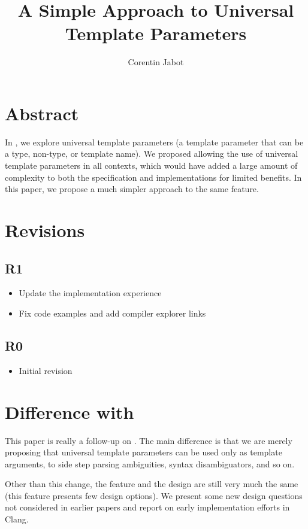 \documentclass{wg21}
\title{A Simple Approach to Universal Template Parameters}
\author{Corentin Jabot}{corentin.jabot@gmail.com}
\begin{document}
\maketitle

\section{Abstract}
In , we explore universal template parameters (a template parameter that can be a type, non-type, or template name).
We proposed allowing the use of universal template parameters in all contexts, which would have added a large amount of complexity to both the specification and implementations
for limited benefits. In this paper, we propose a much simpler approach to the same feature.


\section{Revisions}

\subsection{R1}

\begin{itemize}
    \item Update the implementation experience
    \item Fix code examples and add compiler explorer links
\end{itemize}

\subsection{R0}

\begin{itemize}
    \item{Initial revision}
\end{itemize}


\section{Difference with }

This paper is really a follow-up on .
The main difference is that we are merely proposing that universal template parameters can be used only as template arguments, to side step parsing ambiguities, syntax disambiguators, and so on.

Other than this change, the feature and the design are still very much the same (this feature presents few design options).
We present some new design questions not considered in earlier papers and report on early implementation efforts in Clang.
\end{document}
